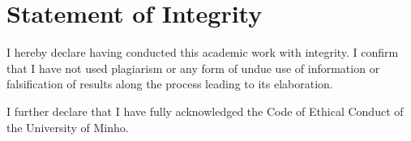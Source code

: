 \chapter{Statement of Integrity}

I hereby declare having conducted this academic work with integrity. I confirm that I have not used
plagiarism or any form of undue use of information or falsification of results along the process leading to
its elaboration.

I further declare that I have fully acknowledged the Code of Ethical Conduct of the University of Minho.

